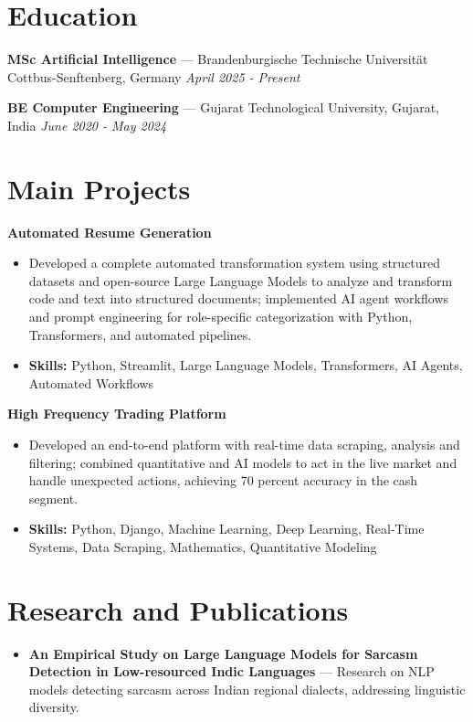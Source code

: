 \documentclass[a4paper,10pt]{article}
\begin{document}
\section*{Education}
\textbf{MSc Artificial Intelligence} — Brandenburgische Technische Universität Cottbus-Senftenberg, Germany \hfill \textit{April 2025 - Present}\par
\vspace{1.5pt}
\textbf{BE Computer Engineering} — Gujarat Technological University, Gujarat, India \hfill \textit{June 2020 - May 2024}\par

\section*{Main Projects}
\textbf{Automated Resume Generation}\par
\vspace{1pt}
\begin{itemize}
  \item Developed a complete automated transformation system using structured datasets and open-source Large Language Models to analyze and transform code and text into structured documents; implemented AI agent workflows and prompt engineering for role-specific categorization with Python, Transformers, and automated pipelines.
  \item \textbf{Skills:} Python, Streamlit, Large Language Models, Transformers, AI Agents, Automated Workflows
\end{itemize}
\vspace{3pt}
\textbf{High Frequency Trading Platform}\par
\vspace{1pt}
\begin{itemize}
  \item Developed an end-to-end platform with real-time data scraping, analysis and filtering; combined quantitative and AI models to act in the live market and handle unexpected actions, achieving 70 percent accuracy in the cash segment.
  \item \textbf{Skills:} Python, Django, Machine Learning, Deep Learning, Real-Time Systems, Data Scraping, Mathematics, Quantitative Modeling
\end{itemize}

\section*{Research and Publications}
\begin{itemize}
\item \textbf{An Empirical Study on Large Language Models for Sarcasm Detection in Low-resourced Indic Languages} — Research on NLP models detecting sarcasm across Indian regional dialects, addressing linguistic diversity.
\end{itemize}
\end{document}
